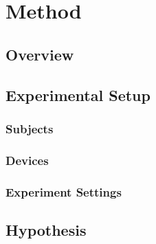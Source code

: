 \chapter{Method\label{cha:chapter5}}
\section{Overview}
\section{Experimental Setup}
\subsection{Subjects}
\subsection{Devices}
\subsection{Experiment Settings}
\section{Hypothesis}

